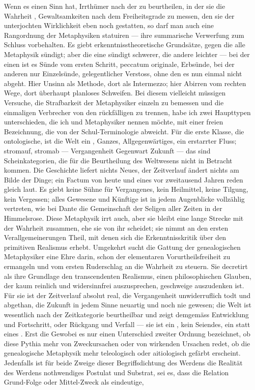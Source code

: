  Wenn es einen Sinn hat, Irrthümer nach der  zu beurtheilen, in der sie die Wahrheit , Gewaltsamkeiten nach dem Freiheitsgrade zu messen, den sie der unterjochten Wirklichkeit eben noch gestatten, so darf man auch eine Rangordnung der Metaphysiken statuiren — ihre summarische Verwerfung zum Schluss vorbehalten. Es giebt erkenntnisstheoretische Grundsätze, gegen die alle Metaphysik sündigt; aber die eine sündigt schwerer, die andere leichter — bei der einen ist es Sünde vom ersten Schritt, peccatum originale, Erbsünde, bei der anderen nur Einzelsünde, gelegentlicher Verstoss, ohne den es nun einmal nicht abgeht. Hier Unsinn als Methode, dort als Intermezzo; hier Abirren vom rechten Wege, dort überhaupt planloses Schweifen. Bei diesem vielleicht müssigen Versuche, die Strafbarkeit der Metaphysiker einzeln zu bemessen und die einmaligen Verbrecher von den rückfälligen zu trennen, habe ich zwei Haupttypen unterschieden, die ich  und  Metaphysiker nennen möchte, mit einer freien Bezeichnung, die von der Schul-Terminologie abweicht. Für die erste Klasse, die ontologische, ist die Welt ein , Ganzes, Allgegenwärtiges, ein erstarrter Fluss; stromauf, stromab — Vergangenheit Gegenwart Zukunft — das sind Scheinkategorien, die für die Beurtheilung des Weltwesens nicht in Betracht kommen. Die Geschichte liefert nichts Neues, der Zeitverlauf ändert nichts am Bilde der Dinge; ein Factum von heute und eines vor zweitausend Jahren reden gleich laut. Es giebt keine Sühne für Vergangenes, kein Heilmittel, keine Tilgung, kein Vergessen; alles Gewesene und Künftige ist in jedem Augenblicke vollzählig vertreten, wie bei Dante die Gemeinschaft der Seligen aller Zeiten in der Himmelsrose. Diese Metaphysik irrt auch, aber sie bleibt eine lange Strecke mit der Wahrheit zusammen, ehe sie von ihr scheidet; sie nimmt an den ersten Verallgemeinerungen Theil, mit denen sich die Erkenntnisskritik über den primitiven Realismus erhebt. Umgekehrt sucht die Gattung der genealogischen Metaphysiker eine Ehre darin, schon der elementaren Vorurtheilsfreiheit zu ermangeln und vom ersten Ruderschlag an  die Wahrheit zu steuern. Sie decretirt als ihre Grundlage den transcendenten Realismus, einen philosophischen Glauben, der kaum reinlich und widersinnfrei auszusprechen, geschweige auszudenken ist. Für sie ist der Zeitverlauf absolut real, die Vergangenheit unwiderruflich todt und abgethan, die Zukunft in jedem Sinne neuartig und noch nie gewesen; die Welt ist wesentlich nach der Zeitkategorie beurtheilbar und zeigt demgemäss Entwicklung und Fortschritt, oder Rückgang und Verfall — sie ist ein , kein Seiendes, ein  statt eines . Erst die Gewobei es nur einen Unterschied zweiter Ordnung bezeichnet, ob diese Pythia mehr von Zweckursachen oder von wirkenden Ursachen redet, ob die genealogische Metaphysik mehr teleologisch oder aitiologisch gefärbt erscheint. Jedenfalls ist für beide Zweige dieser Begriffsdichtung des Werdens die Realität des Werdens nothwendiges Postulat und Substrat, sei es, dass die Relation Grund-Folge oder Mittel-Zweck als eindeutige, 